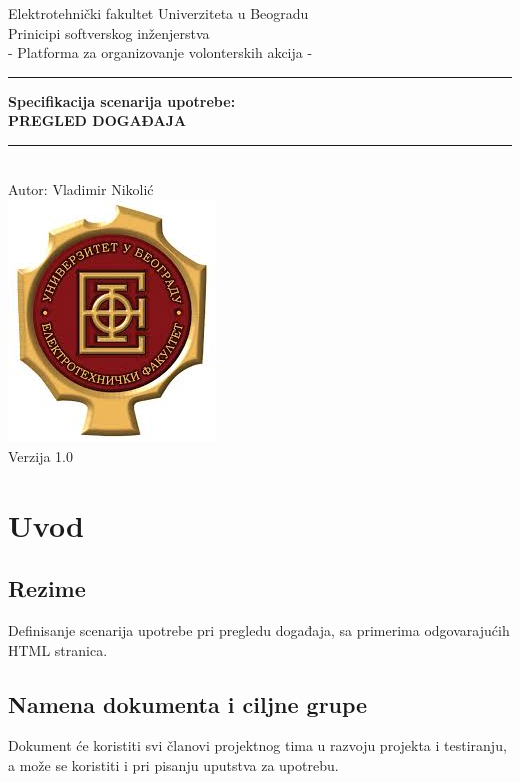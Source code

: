 \documentclass[11pt,a4paper]{article}
\begin{document}
\begin{titlepage}

\centering
\textnormal{\large Elektrotehnički fakultet Univerziteta u Beogradu}\\[0.1cm]
\textnormal{\large Prinicipi softverskog inženjerstva}\\[3cm]

\textnormal{\normalsize - Platforma za organizovanje volonterskih akcija -}\\\vspace{-5mm}
\rule{\textwidth}{0.4pt}
{\huge \bfseries Specifikacija scenarija upotrebe:\\ 
PREGLED DOGAĐAJA\par}\vspace{-1mm}
\rule{\textwidth}{0.4pt}\\\vspace{1mm}
\textnormal{\large Autor: Vladimir Nikolić}\\[6cm]

\includegraphics[scale=0.5]{logo.jpg}\\
\vfill
\textnormal{\normalsize Verzija 1.0}\\

\end{titlepage}

\tableofcontents

\newpage

\section{Uvod}
\subsection{Rezime}
Definisanje scenarija upotrebe pri pregledu događaja, sa primerima odgovarajućih HTML stranica.
\subsection{Namena dokumenta i ciljne grupe}
Dokument će koristiti svi članovi projektnog tima u razvoju projekta i testiranju, a može se koristiti i pri pisanju uputstva za upotrebu.
\end{document}
